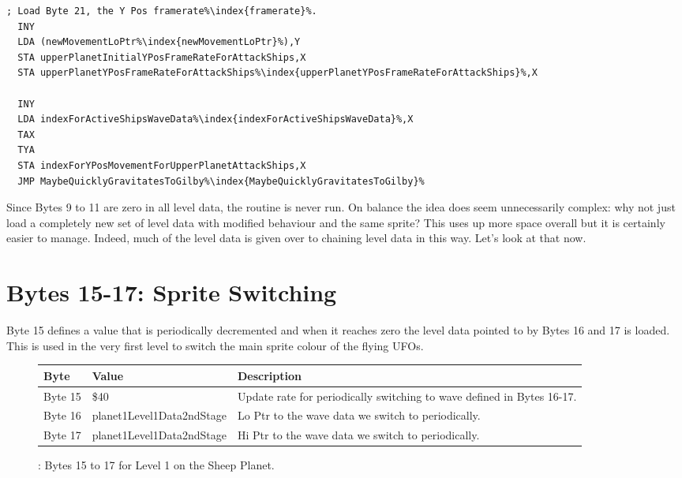 \begin{lstlisting}[escapechar=\%]
  ; Load Byte 21, the Y Pos framerate%\index{framerate}%.
  INY
  LDA (newMovementLoPtr%\index{newMovementLoPtr}%),Y
  STA upperPlanetInitialYPosFrameRateForAttackShips,X
  STA upperPlanetYPosFrameRateForAttackShips%\index{upperPlanetYPosFrameRateForAttackShips}%,X

  INY
  LDA indexForActiveShipsWaveData%\index{indexForActiveShipsWaveData}%,X
  TAX
  TYA
  STA indexForYPosMovementForUpperPlanetAttackShips,X
  JMP MaybeQuicklyGravitatesToGilby%\index{MaybeQuicklyGravitatesToGilby}%
\end{lstlisting}

Since Bytes 9 to 11 are zero in all level data, the routine is never run. On balance the idea does seem
unnecessarily complex: why not just load a completely new set of level data with modified behaviour and
the same sprite? This uses up more space overall but it is certainly easier to manage. Indeed, much
of the level data is given over to chaining level data in this way. Let's look at that now.


\section{Bytes 15-17: Sprite Switching}
Byte 15 defines a value that is periodically decremented and when it reaches zero the level data pointed
to by Bytes 16 and 17 is loaded. This is used in the very first level to switch the main sprite colour
of the flying UFOs. 

\begin{figure}[H]

  {
    \setlength{\tabcolsep}{3.0pt}
    \setlength\cmidrulewidth{\heavyrulewidth} %
    \begin{adjustbox}{width=13cm}

      \begin{tabular}{lll}
        \toprule
        Byte    & Value                     & Description                                                        \\
        \midrule
Byte 15 & \$40                       & Update rate for periodically switching to wave defined in Bytes 16-17. \\
 Byte 16 & planet1Level1Data2ndStage\index{planet1Level1Data2ndStage} & Lo Ptr to the wave data we switch to periodically.               \\
 Byte 17 & planet1Level1Data2ndStage\index{planet1Level1Data2ndStage} & Hi Ptr to the wave data we switch to periodically.               \\
        \bottomrule
      \end{tabular}
    \end{adjustbox}
  }\caption{: Bytes 15 to 17 for Level 1 on the Sheep Planet.}
\end{figure}

